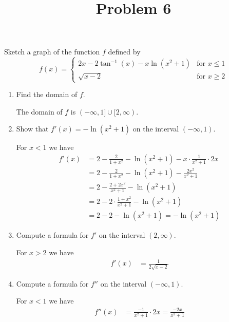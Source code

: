 \documentclass{ximera}
\title[Problem 6]{Problem 6}
\begin{document}
\begin{abstract} \end{abstract}
\maketitle


\begin{problem}
  Sketch a graph of the function $f$ defined by
  \[
    f(x) = \begin{cases}
             2x - 2\tan^{-1}(x) - x \ln(x^2+1) & \mbox{for $x \le 1$}\\
             \sqrt{x - 2} & \mbox{for $x \ge 2$}
           \end{cases}
  \]
  \begin{enumerate}
    \item Find the domain of $f$.
\begin{explanation}
        The domain of $f$ is $(-\infty, 1] \cup [2, \infty)$.
      \end{explanation}

    \item Show that $f'(x) = -\ln(x^2+1)$ on the interval $(-\infty, 1)$.
\begin{explanation}
        For $x < 1$ we have
        \begin{align*}
          f'(x) &= 2 - \frac{2}{1+x^2} - \ln(x^2+1) - x \cdot \frac{1}{x^2+1}\cdot 2x\\
                &= 2 - \frac{2}{1+x^2} - \ln(x^2+1) - \frac{2x^2}{x^2+1}\\
                &= 2 - \frac{2 + 2x^2}{x^2+1} - \ln(x^2+1)\\
                &= 2 -  2\cdot\frac{1+x^2}{x^2+1} - \ln(x^2+1)\\
                &= 2 - 2 - \ln(x^2 +1) = -\ln(x^2+1)
        \end{align*}
      \end{explanation}

    \item Compute a formula for $f'$ on the interval $(2, \infty)$.
\begin{explanation}
        For $x > 2$ we have
        \begin{align*}
          f'(x) &= \frac{1}{2\sqrt{x-2}}
        \end{align*}
      \end{explanation}

    \item Compute a formula for $f''$ on the interval $(-\infty, 1)$.
\begin{explanation}
        For $x < 1$ we have
        \begin{align*}
          f''(x) &= \frac{-1}{x^2+1} \cdot 2x = \frac{-2x}{x^2+1}
        \end{align*}
      \end{explanation}


\end{enumerate}
\end{problem}
\end{document}
